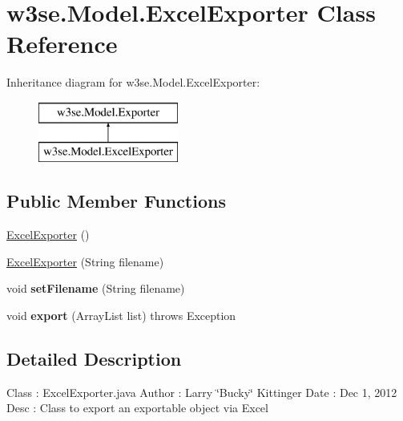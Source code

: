\hypertarget{classw3se_1_1_model_1_1_excel_exporter}{\section{w3se.\-Model.\-Excel\-Exporter Class Reference}
\label{classw3se_1_1_model_1_1_excel_exporter}
}
Inheritance diagram for w3se.\-Model.\-Excel\-Exporter\-:\begin{figure}[H]
\begin{center}
\leavevmode
\includegraphics[height=2.000000cm]{classw3se_1_1_model_1_1_excel_exporter}
\end{center}
\end{figure}
\subsection*{Public Member Functions}
\begin{DoxyCompactItemize}
\item 
\hyperlink{classw3se_1_1_model_1_1_excel_exporter_ab496d3360f034433c295232639144a88}{Excel\-Exporter} ()
\item 
\hyperlink{classw3se_1_1_model_1_1_excel_exporter_aec09beca2ff380fdc03cd71e2606a74e}{Excel\-Exporter} (String filename)
\item 
\hypertarget{classw3se_1_1_model_1_1_excel_exporter_a7cada1e85f0a19940c2bb4b3c2a23f9e}{void {\bfseries set\-Filename} (String filename)}\label{classw3se_1_1_model_1_1_excel_exporter_a7cada1e85f0a19940c2bb4b3c2a23f9e}

\item 
\hypertarget{classw3se_1_1_model_1_1_excel_exporter_a3939a20649527c9750c4e998b4d7c6a0}{void {\bfseries export} (Array\-List list)  throws Exception 	}\label{classw3se_1_1_model_1_1_excel_exporter_a3939a20649527c9750c4e998b4d7c6a0}

\end{DoxyCompactItemize}


\subsection{Detailed Description}
Class \-: Excel\-Exporter.\-java Author \-: Larry \char`\"{}\-Bucky\char`\"{} Kittinger Date \-: Dec 1, 2012 Desc \-: Class to export an exportable object via Excel 

